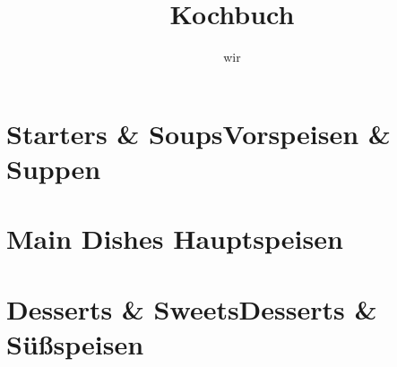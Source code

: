 \documentclass[12pt,a4paper]{scrbook}
\title{Kochbuch}
\author{wir}
\date{}
\begin{document}
\maketitle
\tableofcontents
\chapter[Starters \& Soups]{Starters \& Soups\newline Vorspeisen \& Suppen}



\chapter[Main Dishes]{Main Dishes \newline Hauptspeisen}








\chapter[Desserts \& Sweets]{Desserts \& Sweets\newline Desserts \&
  S\"{u}{\ss}speisen}



\end{document}
